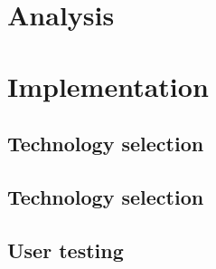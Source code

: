 \documentclass[twoside]{ctuthesis}
\begin{document}
\maketitle




\part{Analysis}




\part{Implementation}
\chapter{Technology selection}
\chapter{Technology selection}
\chapter{User testing}

\appendix
\printindex


\end{document}
